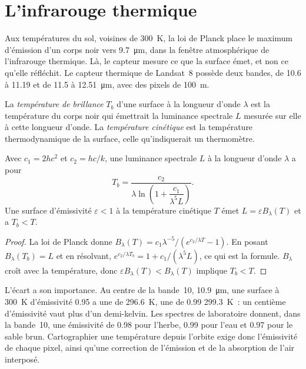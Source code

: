 \section{L'infrarouge thermique}\label{sec:b3:remote-sensing-gis:thermal}

Aux températures du sol, voisines de \qty{300}{K}, la loi de Planck place
le maximum d'émission d'un corps noir vers \qty{9.7}{\micro\metre}, dans la
fenêtre atmosphérique de l'infrarouge thermique. Là, le capteur mesure ce
que la surface émet, et non ce qu'elle réfléchit. Le capteur thermique de Landsat~8
possède deux bandes, de 10.6 à 11.19 et de 11.5 à \qty{12.51}{\micro\metre}, avec
des pixels de \qty{100}{m}.

\begin{definition}\label{def:b3:remote-sensing-gis:brightness}
La \emph{température de brillance} $T_b$ d'une surface
à la longueur d'onde $\lambda$ est la température du corps noir
qui émettrait la luminance spectrale $L$ mesurée sur elle à cette
longueur d'onde. La \emph{température cinétique} est la température thermodynamique
de la surface, celle qu'indiquerait un thermomètre.
\end{definition}

\begin{proposition}\label{prop:b3:remote-sensing-gis:planck-inversion}
Avec $c_1 = 2hc^2$ et $c_2 = hc/k$, une luminance spectrale $L$ à la
longueur d'onde $\lambda$ a pour 
\[
T_b = \frac{c_2}{\lambda \ln\!\left(1 + \dfrac{c_1}{\lambda^5 L}\right)} .
\]
Une surface d'émissivité $\varepsilon < 1$ à la température cinétique $T$
émet $L = \varepsilon B_\lambda(T)$ et a $T_b < T$.
\end{proposition}

\begin{proof}
La loi de Planck donne $B_\lambda(T) = c_1\lambda^{-5}/(e^{c_2/\lambda T} -
1)$. En posant $B_\lambda(T_b) = L$ et en résolvant, $e^{c_2/\lambda T_b} = 1 +
c_1/(\lambda^5L)$, ce qui est la formule. $B_\lambda$ croît avec la
température, donc $\varepsilon B_\lambda(T) < B_\lambda(T)$ implique $T_b < T$.
\end{proof}

L'écart a son importance. Au centre de la bande~10, \qty{10.9}{\micro\metre},
une surface à \qty{300}{K} d'émissivité 0.95 a une 
de \qty{296.6}{K}, une de 0.99 \qty{299.3}{K}~: un centième d'émissivité vaut
plus d'un demi-kelvin. Les spectres de laboratoire donnent,
dans la bande~10, une émissivité de 0.98 pour l'herbe, 0.99 pour l'eau et
0.97 pour le sable brun. Cartographier une température depuis l'orbite exige donc
l'émissivité de chaque pixel, ainsi qu'une correction de l'émission et de la
absorption de l'air interposé.


